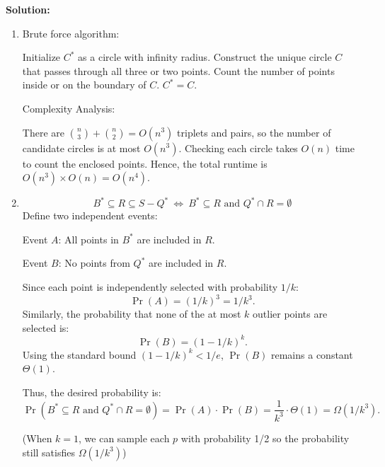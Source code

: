 \documentclass[11pt]{article}
\begin{document}
\begin{description}
\newpage
\textbf{Solution:}
\begin{enumerate}
  \item[(a)] Brute force algorithm:
  
  \begin{algorithm}
  \caption{}
  \begin{algorithmic}[1]
    \State Initialize $C^*$ as a circle with infinity radius.
      \State Construct the unique circle $C$ that passes through all three or two points.
      \State Count the number of points inside or on the boundary of $C$.
        \State $C^* = C$.
      \EndIf
    \EndFor
    \State {}
  \end{algorithmic}
  \end{algorithm}

  Complexity Analysis:

  There are $\binom{n}{3} + \binom{n}{2} = O(n^3)$ triplets and pairs, 
  so the number of candidate circles is at most $O(n^3)$.
  Checking each circle takes $O(n)$ time to count the enclosed points.
  Hence, the total runtime is $O(n^3) \times O(n) = O(n^4)$.

  \item[(b)]
  \[
  B^*\subseteq R\subseteq S-Q^* \ \Leftrightarrow \
  B^* \subseteq R \text{ and } Q^* \cap R = \emptyset
  \]
  Define two independent events:

  Event $A$: All points in $B^*$ are included in $R$.

  Event $B$: No points from $Q^*$ are included in $R$.

  Since each point is independently selected with probability $1/k$:
  \[
  \Pr(A) = (1/k)^3 = 1/k^3.
  \]
  Similarly, the probability that none of the at most $k$ outlier points are selected is:
  \[
  \Pr(B) = (1 - 1/k)^k.
  \]
  Using the standard bound $(1 - 1/k)^k < 1/e$, $\Pr(B)$ remains a constant $\Theta(1)$.

  Thus, the desired probability is:
  \[
  \Pr(B^* \subseteq R \text{ and } Q^* \cap R = \emptyset) = \Pr(A) \cdot \Pr(B) = \frac{1}{k^3} \cdot \Theta(1) = \Omega(1/k^3).
  \]

  (When $k=1$, we can sample each $p$ with probability 1/2 so the probability still satisfies $\Omega(1/k^3)$)


\end{enumerate}
\end{description}
\end{document}

